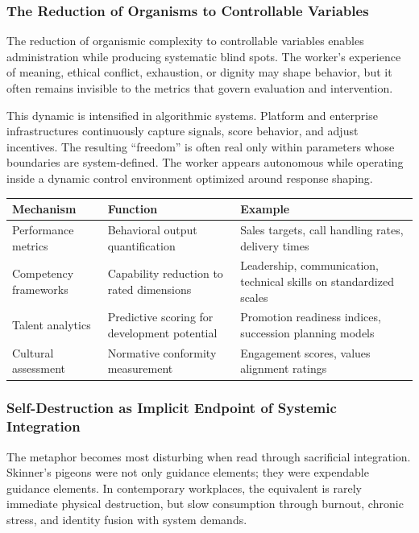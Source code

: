 \documentclass[11pt, a4paper]{article}
\begin{document}
\subsubsection{The Reduction of Organisms to Controllable Variables}
The reduction of organismic complexity to controllable variables enables administration while producing systematic blind spots. The worker's experience of meaning, ethical conflict, exhaustion, or dignity may shape behavior, but it often remains invisible to the metrics that govern evaluation and intervention.

This dynamic is intensified in algorithmic systems. Platform and enterprise infrastructures continuously capture signals, score behavior, and adjust incentives. The resulting ``freedom'' is often real only within parameters whose boundaries are system-defined. The worker appears autonomous while operating inside a dynamic control environment optimized around response shaping.

\begin{longtable}{p{}p{}p{}}
\toprule
\textbf{Mechanism} & \textbf{Function} & \textbf{Example} \\
\midrule
\endhead
Performance metrics & Behavioral output quantification & Sales targets, call handling rates, delivery times \\
Competency frameworks & Capability reduction to rated dimensions & Leadership, communication, technical skills on standardized scales \\
Talent analytics & Predictive scoring for development potential & Promotion readiness indices, succession planning models \\
Cultural assessment & Normative conformity measurement & Engagement scores, values alignment ratings \\
\bottomrule
\end{longtable}

\subsubsection{Self-Destruction as Implicit Endpoint of Systemic Integration}
The metaphor becomes most disturbing when read through sacrificial integration. Skinner's pigeons were not only guidance elements; they were expendable guidance elements. In contemporary workplaces, the equivalent is rarely immediate physical destruction, but slow consumption through burnout, chronic stress, and identity fusion with system demands.
\end{document}
